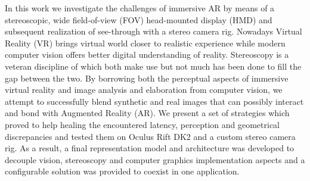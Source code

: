 \sommario

In this work we investigate the challenges of immersive AR by means of a stereoscopic, wide field-of-view (FOV) head-mounted display (HMD) and subsequent realization of see-through with a stereo camera rig. Nowadays Virtual Reality (VR) brings virtual world closer to realistic experience while modern computer vision offers better digital understanding of reality. Stereoscopy is a veteran discipline of which both make use but not much has been done to fill the gap between the two. By borrowing both the perceptual aspects of immersive virtual reality and image analysis and elaboration from computer vision, we attempt to successfully blend synthetic and real images that can possibly interact and bond with Augmented Reality (AR). We present a set of strategies which proved to help healing the encountered latency, perception and geometrical discrepancies and tested them on Oculus Rift DK2 and a custom stereo camera rig. As a result, a final representation model and architecture was developed to decouple vision, stereoscopy and computer graphics implementation aspects and a configurable solution was provided to coexist in one application.